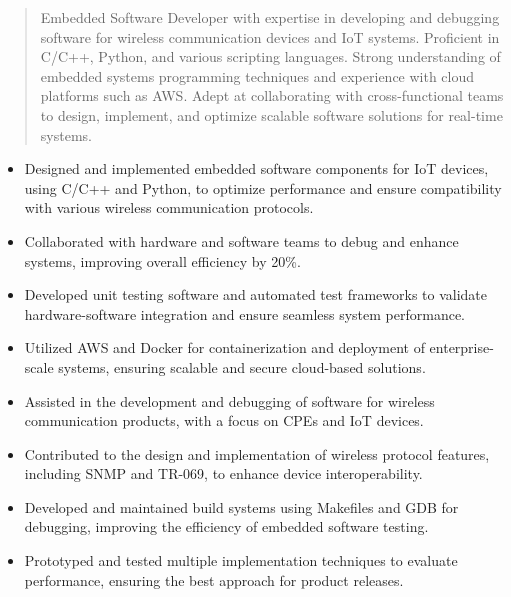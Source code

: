



\makecvheader

\begin{quote}
  \noindent
  Embedded Software Developer with expertise in developing and debugging software for wireless communication devices and IoT systems. Proficient in C/C++, Python, and various scripting languages. Strong understanding of embedded systems programming techniques and experience with cloud platforms such as AWS. Adept at collaborating with cross-functional teams to design, implement, and optimize scalable software solutions for real-time systems.
\end{quote}

\begin{itemize}
    \item Designed and implemented embedded software components for IoT devices, using C/C++ and Python, to optimize performance and ensure compatibility with various wireless communication protocols.
    \item Collaborated with hardware and software teams to debug and enhance systems, improving overall efficiency by 20\%.
    \item Developed unit testing software and automated test frameworks to validate hardware-software integration and ensure seamless system performance.
    \item Utilized AWS and Docker for containerization and deployment of enterprise-scale systems, ensuring scalable and secure cloud-based solutions.
\end{itemize}

\divider

\begin{itemize}
    \item Assisted in the development and debugging of software for wireless communication products, with a focus on CPEs and IoT devices.
    \item Contributed to the design and implementation of wireless protocol features, including SNMP and TR-069, to enhance device interoperability.
    \item Developed and maintained build systems using Makefiles and GDB for debugging, improving the efficiency of embedded software testing.
    \item Prototyped and tested multiple implementation techniques to evaluate performance, ensuring the best approach for product releases.
\end{itemize}

